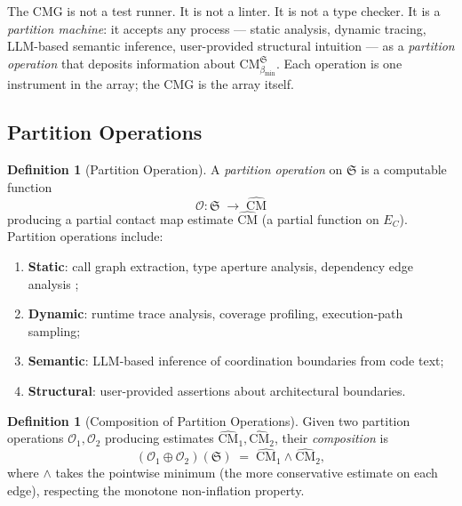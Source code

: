 \documentclass[12pt,a4paper,twocolumn]{article}
\theoremstyle{plain}
\theoremstyle{definition}
\newtheorem{definition}[theorem]{Definition}
\theoremstyle{remark}
\newcommand{\CM}{\mathrm{CM}}
\newcommand{\bmin}{\beta_{\min}}
\newcommand{\CMbmin}{\CM_{\bmin}}
\begin{document}
The CMG is not a test runner.  It is not a linter.  It is not a type checker.
It is a \emph{partition machine}: it accepts any process --- static analysis,
dynamic tracing, LLM-based semantic inference, user-provided structural
intuition --- as a \emph{partition operation} that deposits information about
$\CMbmin^\mathfrak{S}$.  Each operation is one instrument in the array;
the CMG is the array itself.

\subsection{Partition Operations}

\begin{definition}[Partition Operation]
\label{def:partition-operation}
A \emph{partition operation} on $\mathfrak{S}$ is a computable function
\begin{equation}
  \mathcal{O} : \mathfrak{S} \;\longrightarrow\; \hat{\CM}
\end{equation}
producing a partial contact map estimate $\hat{\CM}$ (a partial function on
$E_C$).  Partition operations include:
\begin{enumerate}[label=(\alph*)]
  \item \textbf{Static}: call graph extraction, type aperture analysis,
    dependency edge analysis \citep{nielson1999principles, aho2006compilers};
  \item \textbf{Dynamic}: runtime trace analysis, coverage profiling,
    execution-path sampling;
  \item \textbf{Semantic}: LLM-based inference of coordination boundaries
    from code text;
  \item \textbf{Structural}: user-provided assertions about architectural
    boundaries.
\end{enumerate}
\end{definition}

\begin{definition}[Composition of Partition Operations]
\label{def:composition}
Given two partition operations $\mathcal{O}_1, \mathcal{O}_2$ producing
estimates $\hat{\CM}_1, \hat{\CM}_2$, their \emph{composition} is
\begin{equation}
  (\mathcal{O}_1 \oplus \mathcal{O}_2)(\mathfrak{S}) \;=\;
    \hat{\CM}_1 \wedge \hat{\CM}_2,
\end{equation}
where $\wedge$ takes the pointwise minimum (the more conservative estimate
on each edge), respecting the monotone non-inflation property.
\end{definition}
\end{document}
